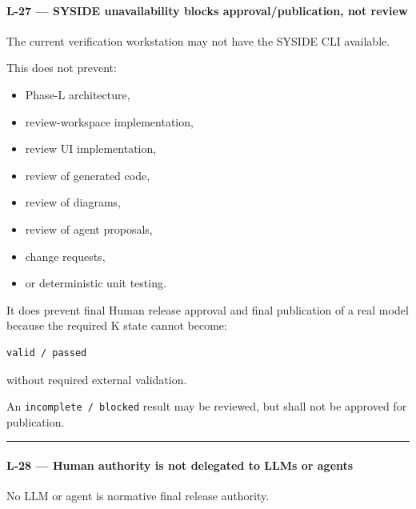 \hypertarget{l-27--syside-unavailability-blocks-approvalpublication-not-review}{%
\paragraph{L-27 --- SYSIDE unavailability blocks approval/publication, not review}\label{l-27--syside-unavailability-blocks-approvalpublication-not-review}}

The current verification workstation may not have the SYSIDE CLI available.

This does not prevent:

\begin{itemize}
\tightlist
\item
  Phase-L architecture,
\item
  review-workspace implementation,
\item
  review UI implementation,
\item
  review of generated code,
\item
  review of diagrams,
\item
  review of agent proposals,
\item
  change requests,
\item
  or deterministic unit testing.
\end{itemize}

It does prevent final Human release approval and final publication of a real model because the required K state cannot become:

\begin{verbatim}
valid / passed
\end{verbatim}

without required external validation.

An \texttt{incomplete\ /\ blocked} result may be reviewed, but shall not be approved for publication.

\begin{center}\rule{0.5\linewidth}{0.5pt}\end{center}

\hypertarget{l-28--human-authority-is-not-delegated-to-llms-or-agents}{%
\paragraph{L-28 --- Human authority is not delegated to LLMs or agents}\label{l-28--human-authority-is-not-delegated-to-llms-or-agents}}

No LLM or agent is normative final release authority.

